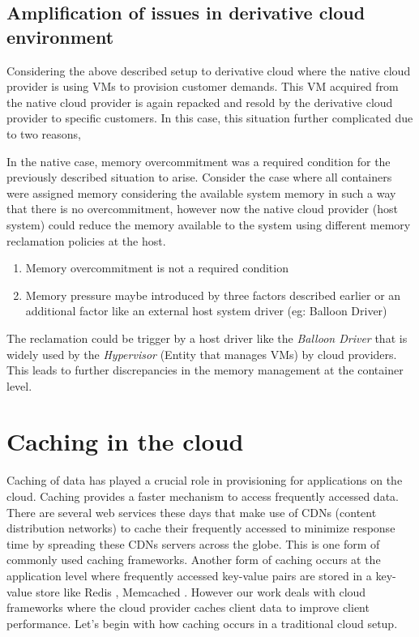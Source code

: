     \subsection{Amplification of issues in derivative cloud environment}
      
      Considering the above described setup to derivative cloud where the native cloud provider is using VMs to provision customer demands. 
This VM acquired from the native cloud provider is again repacked and resold by the derivative cloud provider to specific customers. In 
this case, this situation further complicated due to two reasons,
      
      In the native case, memory overcommitment was a required condition for the previously described situation to arise. Consider the case 
where all containers were assigned memory considering the available system memory in such a way that there is no overcommitment, however 
now the native cloud provider (host system) could reduce the memory available to the system using different memory reclamation policies at 
the host.
       
       \begin{enumerate}
	  \item Memory overcommitment is not a required condition
	  \item Memory pressure maybe introduced by three factors described earlier or an additional factor like an external host system 
driver (eg: Balloon Driver)
       \end{enumerate} 

      The reclamation could be trigger by a host driver like the \textit{Balloon Driver} that is widely used by the \textit{Hypervisor} 
(Entity that manages VMs) by cloud providers. This leads to further discrepancies in the memory management at the container level. 
  
  \section{Caching in the cloud}
    Caching of data has played a crucial role in provisioning for applications on the cloud. Caching provides a faster
    mechanism to access frequently accessed data. There are several web services these days that make use of CDNs (content 
    distribution networks) to cache their frequently accessed to minimize response time by spreading these CDNs servers across
    the globe. This is one form of commonly used caching frameworks. Another form of caching occurs at the application level
    where frequently accessed key-value pairs are stored in a key-value store like Redis \cite{redis}, Memcached \cite{memcached}.
    However our work deals with cloud frameworks where the cloud provider caches client data to improve client performance.
    Let's begin with how caching occurs in a traditional cloud setup.
    
